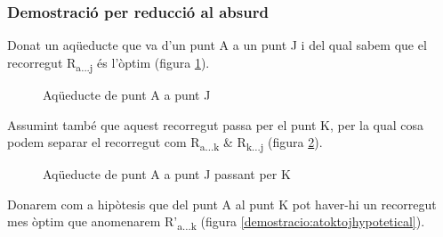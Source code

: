 \documentclass[12pt, letterpaper]{article}
\begin{document}
\newpage
\subsubsection{Demostració per reducció al absurd}
Donat un aqüeducte que va d'un punt A a un punt J i del qual sabem que el recorregut R\textsubscript{a...j} és l'òptim (figura \ref{demostracio:atoj}).

\begin{figure}[htbp]
\begin{center}
\caption{Aqüeducte de punt A a punt J}
\label{demostracio:atoj}
\end{center}
\end{figure}

Assumint també que aquest recorregut passa per el punt K, per la qual cosa podem separar el recorregut com R\textsubscript{a...k} \& R\textsubscript{k...j} (figura \ref{demostracio:atoktoj}).

\begin{figure}[htbp]
\begin{center}
\caption{Aqüeducte de punt A a punt J passant per K}
\label{demostracio:atoktoj}
\end{center}
\end{figure}

Donarem com a hipòtesis que del punt A al punt K pot haver-hi un recorregut mes òptim que anomenarem R'\textsubscript{a...k} (figura \ref{demostracio:atoktojhypotetical}).
\end{document}

